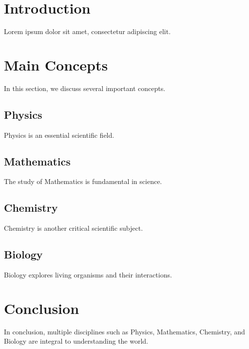 \documentclass{article}
\begin{document}
\section{Introduction}
Lorem ipsum dolor sit amet, consectetur adipiscing elit. 

\section{Main Concepts}
In this section, we discuss several important concepts.

\subsection{Physics}
Physics is an essential scientific field.

\subsection{Mathematics}
The study of Mathematics is fundamental in science.

\subsection{Chemistry}
Chemistry is another critical scientific subject.

\subsection{Biology}
Biology explores living organisms and their interactions.

\section{Conclusion}
In conclusion, multiple disciplines such as Physics, Mathematics, Chemistry, and Biology are integral to understanding the world.

\newpage
\printindex
\end{document}
